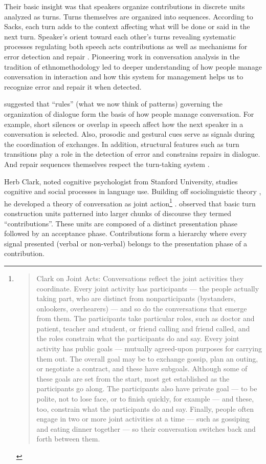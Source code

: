 Their basic insight was that speakers organize contributions in discrete units analyzed as turns. Turns themselves are organized into sequences. According to Sacks, each turn adds to the context affecting what will be done or said in the next turn. Speaker's orient toward each other's turns revealing systematic processes regulating both speech acts contributions as well as mechanisms for error detection and repair  \citep{Levinson:1983ww}.  Pioneering work in conversation analysis in the tradition of ethnomethodology led to deeper understanding of how people manage conversation in interaction and how this system for management helps us to recognize error and repair it when detected. 

 \cite*{Sacks:1974uy}  suggested that ``rules'' (what we now think of patterns) governing the organization of dialogue form the basis of how people manage conversation. For example, short silences or overlap in speech affect how the next speaker in a conversation is selected. Also, prosodic and gestural cues serve as signals during the coordination of exchanges. In addition, structural features such as turn transitions play a role in the detection of error and constrains repairs in dialogue. And repair sequences themselves respect the turn-taking system  \citep{Schegloff:1977tc}. 

Herb Clark, noted cognitive psychologist from Stanford University, studies cognitive and social processes in language use. Building off sociolinguistic theory  \citep{Schegloff:1973tg,Sacks:1974uy,Clark:1989ur,Schegloff:1977tc,Jefferson:1972ta},   he developed a theory of conversation as joint action\footnote{ \begin{quote} 
Clark on Joint Acts: Conversations reflect the joint activities they coordinate. Every joint activity has participants --- the people actually taking part, who are distinct from nonparticipants (bystanders, onlookers, overhearers) --- and so do the conversations that emerge from them. The participants take particular roles, such as doctor and patient, teacher and student, or friend calling and friend called, and the roles constrain what the participants do and say. Every joint activity has public goals --- mutually agreed-upon purposes for carrying them out. The overall goal may be to exchange gossip, plan an outing, or negotiate a contract, and these have subgoals. Although some of these goals are set from the start, most get established as the participants go along. The participants also have private goal --- to be polite, not to lose face, or to finish quickly, for example --- and these, too, constrain what the participants do and say. Finally, people often engage in two or more joint activities at a time --- such as gossiping and eating dinner together --- so their conversation switches back and forth between them. \citeyearpar[p. 2744]{Clark:2001uu}
\end{quote} }  \citep{Clark:2001uu}. \cite{Clark:1989ur}  observed that basic turn construction units patterned into larger chunks of discourse they termed ``contributions''. These units are composed of a distinct presentation phase followed by an acceptance phase. Contributions form a hierarchy where every signal presented (verbal or non-verbal) belongs to the presentation phase of a contribution.


